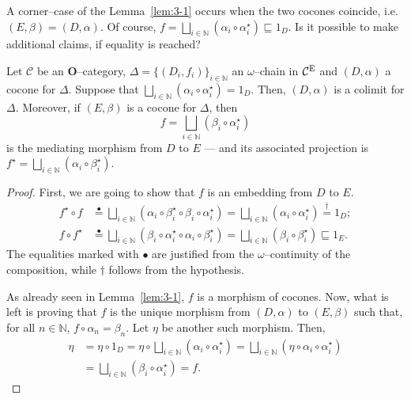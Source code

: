 A corner--case of the Lemma~\ref{lem:3-1} occurs when the two cocones coincide, i.e. \((E,\beta) = (D,\alpha)\). %
Of course, \(f = \bigsqcup_{i \in \mathbb{N}}(\alpha_i \circ \alpha_i^\star) \sqsubseteq 1_D\).
Is it possible to make additional claims, if equality is reached?

\begin{thm}\label{thm:3-1}
  Let \(\mathcal{C}\) be an \(\mathbf{O}\)--category, \(\Delta = \lbrace (D_i,f_i) \rbrace_{i \in \mathbb{N}}\) an \(\omega{}\)--chain in \(\mathcal{C}^\textup{E}\) and \((D,\alpha)\) a cocone for \(\Delta{}\).
  Suppose that \(\bigsqcup_{i \in \mathbb{N}}(\alpha_i \circ \alpha_i^\star) = 1_D\).
  Then, \((D,\alpha)\) is a colimit for \(\Delta{}\).
  Moreover, if \((E,\beta)\) is a cocone for \(\Delta{}\), then
  \begin{equation*}
    f = \bigsqcup_{i \in \mathbb{N}}(\beta_i \circ \alpha_i^\star)
  \end{equation*}
  is the mediating morphism from \(D\) to \(E\) --- and its associated projection is \(f^\star = \bigsqcup_{i \in \mathbb{N}}(\alpha_i \circ \beta_i^\star)\).
\end{thm}
\begin{proof}
  First, we are going to show that \(f\) is an embedding from \(D\) to \(E\).
  \begin{align*}
    f^\star \circ f &\overset{\bullet}{=}
    \bigsqcup_{i \in \mathbb{N}}(\alpha_i \circ \beta_i^\star \circ \beta_i \circ \alpha_i^\star) =
    \bigsqcup_{i \in \mathbb{N}}(\alpha_i \circ \alpha_i^\star) \overset{\dagger}{=} 1_D; \\
    f \circ f^\star &\overset{\bullet}{=}
    \bigsqcup_{i \in \mathbb{N}}(\beta_i \circ \alpha_i^\star \circ \alpha_i \circ \beta_i^\star) =
    \bigsqcup_{i \in \mathbb{N}}(\beta_i \circ \beta_i^\star)
    \sqsubseteq 1_E.
  \end{align*}
  The equalities marked with \(\bullet\) are justified from the \(\omega\)--continuity of the composition, while \(\dagger\) follows from the hypothesis. %

  As already seen in Lemma~\ref{lem:3-1}, \(f\) is a morphism of cocones.
  Now, what is left is proving that \(f\) is the unique morphism from \((D,\alpha)\) to \((E,\beta)\) such that, for all \(n \in \mathbb{N}\), \(f \circ \alpha_n = \beta_n\).
  Let \(\eta\) be another such morphism. Then, %
  \begin{equation*}
    \begin{split}
      \eta &= \eta \circ 1_D
      = \eta \circ \bigsqcup_{i \in \mathbb{N}}(\alpha_i \circ \alpha_i^\star) = \bigsqcup_{i \in \mathbb{N}}(\eta \circ \alpha_i \circ \alpha_i^\star) \\
      &= \bigsqcup_{i \in \mathbb{N}}(\beta_i \circ \alpha_i^\star)
      = f.
    \end{split}
  \end{equation*}
\end{proof}


